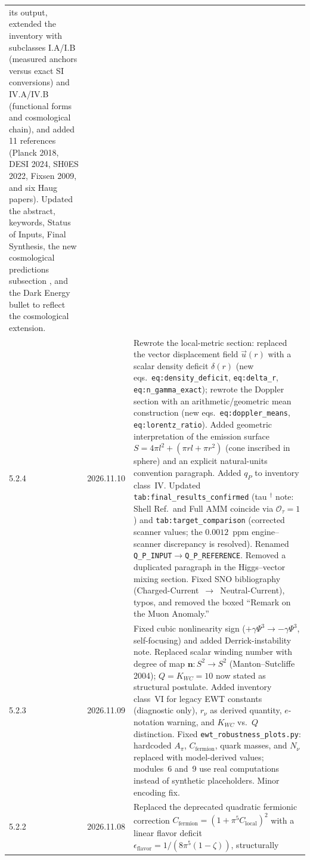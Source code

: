 \documentclass[10pt,a4paper]{article}
\begin{document}
\begin{longtable}{@{}p{1.6cm}p{1.8cm}p{10.1cm}@{}}
	its output, extended
	the inventory with subclasses
	I.A/I.B (measured anchors versus exact SI conversions) and IV.A/IV.B
	(functional forms and cosmological chain), and added 11 references
	(Planck 2018, DESI 2024, SH0ES 2022, Fixsen 2009, and six Haug papers).
	Updated the abstract, keywords, Status of Inputs, Final Synthesis, the
	new cosmological predictions subsection
	, and the Dark Energy bullet to reflect the cosmological extension. \\
	5.2.4 & 2026.11.10 &
	Rewrote the local-metric section: replaced the vector displacement
	field $\vec{u}(r)$ with a scalar density deficit $\delta(r)$ (new
	eqs.~\texttt{eq:density\_deficit}, \texttt{eq:delta\_r},
	\texttt{eq:n\_gamma\_exact}); rewrote the Doppler section with an
	arithmetic/geometric mean construction (new eqs.~\texttt{eq:doppler\_means},
	\texttt{eq:lorentz\_ratio}). Added geometric interpretation of the
	emission surface $S = 4\pi l^2 + (\pi rl + \pi r^2)$ (cone inscribed
	in sphere) and an explicit natural-units convention paragraph.
	Added $q_P$ to inventory class~IV. Updated
	\texttt{tab:final\_results\_confirmed} (tau $^\dagger$ note:
	Shell Ref.\ and Full AMM coincide via $\mathcal{O}_\tau=1$) and
	\texttt{tab:target\_comparison} (corrected scanner values; the
	$0.0012$~ppm engine--scanner discrepancy is resolved). Renamed
	\texttt{Q\_P\_INPUT}$\to$\texttt{Q\_P\_REFERENCE}. Removed a
	duplicated paragraph in the Higgs--vector mixing section. Fixed SNO
	bibliography (Charged-Current~$\to$~Neutral-Current), typos, and
	removed the boxed ``Remark on the Muon Anomaly.'' \\
	5.2.3 & 2026.11.09 &
	Fixed cubic nonlinearity sign ($+\gamma\Psi^{3} \to -\gamma\Psi^{3}$,
	self-focusing) and added Derrick-instability note. Replaced scalar
	winding number with degree of map $\mathbf{n}: S^2 \to S^2$
	(Manton--Sutcliffe 2004); $Q = K_{WC} = 10$ now stated as structural
	postulate. Added inventory class~VI for legacy EWT constants
	(diagnostic only), $r_\nu$ as derived quantity, $e$-notation warning,
	and $K_{WC}$ vs.\ $Q$ distinction. Fixed \texttt{ewt\_robustness\_plots.py}:
	hardcoded $A_\pi$, $C_{\text{fermion}}$, quark masses, and $N_\nu$
	replaced with model-derived values; modules~6 and~9 use real
	computations instead of synthetic placeholders. Minor encoding fix. \\
	5.2.2 & 2026.11.08 &
	Replaced the deprecated quadratic fermionic correction
	$C_{\text{fermion}} = (1 + \pi^5 C_{\text{local}})^2$ with a linear
	flavor deficit
	$\epsilon_{\text{flavor}} = 1/(8\pi^5(1-\zeta))$, structurally

\end{longtable}
\end{document}
